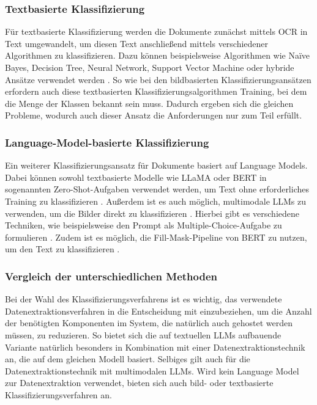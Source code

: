 \subsubsection{Textbasierte Klassifizierung}
\label{subsubsec:text-basierte-klassifizierung}

Für textbasierte Klassifizierung werden die Dokumente zunächst mittels \gls{OCR} in Text umgewandelt, um diesen Text anschließend mittels verschiedener Algorithmen zu klassifizieren. Dazu können beispielsweise Algorithmen wie Naïve Bayes, Decision Tree, Neural Network, Support Vector Machine oder hybride Ansätze verwendet werden \parencite{dalal2011automatic, RasjidZulfanyErlisa2017PCaO, YangYiming1999Arot}. So wie bei den bildbasierten Klassifizierungsansätzen erfordern auch diese textbasierten Klassifizierungsalgorithmen Training, bei dem die Menge der Klassen bekannt sein muss. Dadurch ergeben sich die gleichen Probleme, wodurch auch dieser Ansatz die Anforderungen nur zum Teil erfüllt.

\subsubsection{Language-Model-basierte Klassifizierung}
\label{subsubsec:language-model-basierte-klassifizierung}

Ein weiterer Klassifizierungsansatz für Dokumente basiert auf Language Models. Dabei können sowohl textbasierte Modelle wie LLaMA oder BERT in sogenannten Zero-Shot-Aufgaben verwendet werden, um Text ohne erforderliches Training zu klassifizieren \parencite{PuriRaul2019ZTCW, bert_as_classifier_without_fine_tuning}. Außerdem ist es auch möglich, multimodale LLMs zu verwenden, um die Bilder direkt zu klassifizieren \parencite{LiJunnan2023BBLP, CaffagniDavide2024WHRG}. Hierbei gibt es verschiedene Techniken, wie beispielsweise den Prompt als Multiple-Choice-Aufgabe zu formulieren \parencite{PuriRaul2019ZTCW}. Zudem ist es möglich, die Fill-Mask-Pipeline von BERT zu nutzen, um den Text zu klassifizieren \parencite{bert_as_classifier_without_fine_tuning}.

\subsubsection{Vergleich der unterschiedlichen Methoden}
\label{subsubsec:vergleich-der-unterschiedlichen-methoden}

Bei der Wahl des Klassifizierungsverfahrens ist es wichtig, das verwendete Datenextraktionsverfahren in die Entscheidung mit einzubeziehen, um die Anzahl der benötigten Komponenten im System, die natürlich auch gehostet werden müssen, zu reduzieren. So bietet sich die auf textuellen \glspl{LLM} aufbauende Variante natürlich besonders in Kombination mit einer Datenextraktionstechnik an, die auf dem gleichen Modell basiert. Selbiges gilt auch für die Datenextraktionstechnik mit multimodalen \glspl{LLM}. Wird kein Language Model zur Datenextraktion verwendet, bieten sich auch bild- oder textbasierte Klassifizierungsverfahren an.


